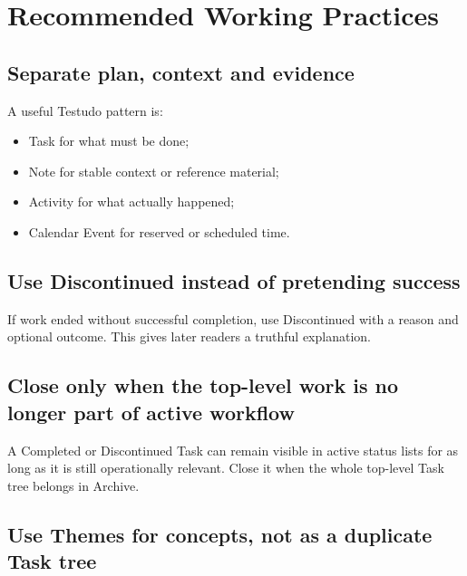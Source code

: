 \documentclass{testudomanual}
\begin{document}

\chapter{Recommended Working Practices}

\section{Separate plan, context and evidence}

A useful Testudo pattern is:
\begin{itemize}
    \item Task for what must be done;
    \item Note for stable context or reference material;
    \item Activity for what actually happened;
    \item Calendar Event for reserved or scheduled time.
\end{itemize}

\section{Use Discontinued instead of pretending success}

If work ended without successful completion, use Discontinued with a reason and optional outcome. This gives later readers a truthful explanation.

\section{Close only when the top-level work is no longer part of active workflow}

A Completed or Discontinued Task can remain visible in active status lists for as long as it is still operationally relevant. Close it when the whole top-level Task tree belongs in Archive.

\section{Use Themes for concepts, not as a duplicate Task tree}
\end{document}
